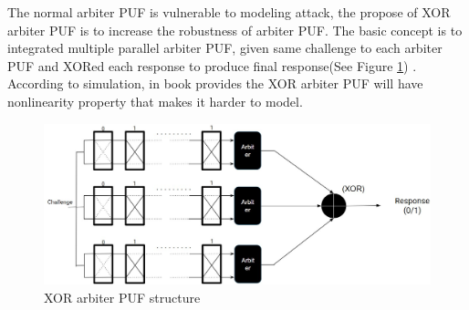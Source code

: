 The normal arbiter PUF is vulnerable to modeling attack, the propose of XOR arbiter PUF is to increase the robustness of arbiter PUF. The basic concept is to integrated multiple parallel arbiter PUF, given same challenge to each arbiter PUF and XORed each response to produce final response(See Figure \ref{fig:figure7}) \cite{Reference5}.
According to simulation, in book \cite{Reference4} provides the XOR arbiter PUF will have nonlinearity property that makes it harder to model.

\begin{figure}[htp]
    \centering
    \includegraphics[width=12cm]{figures/figure7.jpg}
    \caption{XOR arbiter PUF structure}
    \label{fig:figure7}
    \end{figure}


